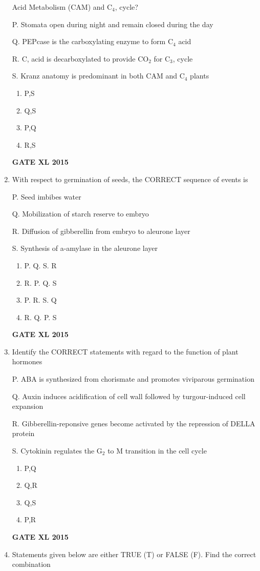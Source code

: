 \documentclass[journal,12pt,onecolumn]{IEEEtran}
\begin{document}
\begin{enumerate}
Acid Metabolism (CAM) and C$_4$, cycle?

P. Stomata open during night and remain closed during the day

Q. PEPcase is the carboxylating enzyme to form C$_4$ acid

R. C, acid is decarboxylated to provide CO$_2$ for C$_3$, cycle

S. Kranz anatomy is predominant in both CAM and C$_4$ plants
    \begin{enumerate}
            \item P,S
	    \item Q,S
	    \item P,Q
            \item R,S
    \end{enumerate}
\begin{flushright}\textbf{GATE XL 2015}\end{flushright}
\item With respect to germination of seeds, the CORRECT sequence of events is

P. Seed imbibes water

Q. Mobilization of starch reserve to embryo

R. Diffusion of gibberellin from embryo to aleurone layer

S. Synthesis of a-amylase in the aleurone layer
    \begin{enumerate}
            \item P. Q. S. R
	    \item R. P. Q. S
	    \item P. R. S. Q
            \item R. Q. P. S
    \end{enumerate}
\begin{flushright}\textbf{GATE XL 2015}\end{flushright}
\item 
Identify the CORRECT statements with regard to the function of plant hormones

P. ABA is synthesized from chorismate and promotes viviparous germination

Q. Auxin induces acidification of cell wall followed by turgour-induced cell expansion

R. Gibberellin-reponsive genes become activated by the repression of DELLA protein

S. Cytokinin regulates the G$_2$ to M transition in the cell cycle
    \begin{enumerate}
            \item P,Q
	    \item Q,R
	    \item Q,S
            \item P,R
    \end{enumerate}
\begin{flushright}\textbf{GATE XL 2015}\end{flushright}
\item Statements given below are either TRUE (T) or FALSE (F). Find the correct combination


\end{enumerate}
\end{document}
